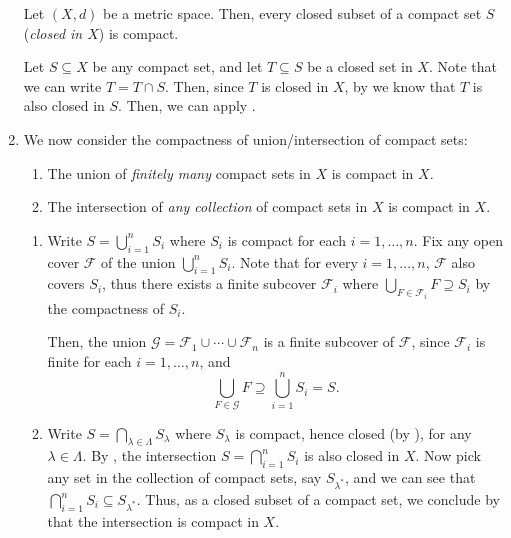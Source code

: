 \begin{enumerate}
\begin{corollary}
\label{cor:closed-subset-of-cpt-is-cpt}
Let \((X,d)\) be a metric space.  Then, every closed subset of a compact set
\(S\) (\emph{closed in \(X\)}) is compact.
\end{corollary}
\begin{pf}
Let \(S\subseteq X\) be any compact set, and let \(T\subseteq S\) be a closed
set in \(X\). Note that we can write \(T=T\cap S\). Then, since \(T\) is closed
in \(X\), by  we know that
\(T\) is also closed in \(S\).  Then, we can apply
.
\end{pf}
\item We now consider the compactness of union/intersection of compact sets:
\begin{enumerate}
\item \label{it:cpt-union-cpt} The union of \emph{finitely many} compact sets in \(X\) is compact in
\(X\).
\item \label{it:cpt-intersect-cpt} The intersection of \emph{any collection} of compact sets in \(X\) is
compact in \(X\).
\end{enumerate}
\begin{pf}
\begin{enumerate}
\item Write \(\displaystyle S=\bigcup_{i=1}^{n}S_i\) where \(S_i\) is compact
for each \(i=1,\dotsc,n\).  Fix any open cover \(\mathcal{F}\) of the union
\(\bigcup_{i=1}^{n}S_i\). Note that for every \(i=1,\dotsc,n\), \(\mathcal{F}\)
also covers \(S_i\), thus there exists a finite subcover \(\mathcal{F}_i\)
where \(\displaystyle \bigcup_{F\in\mathcal{F}_i}F\supseteq S_i\) by the compactness of \(S_i\).

Then, the union \(\mathcal{G}=\mathcal{F}_1\cup\dotsb\cup \mathcal{F}_n\) is a finite
subcover of \(\mathcal{F}\), since \(\mathcal{F}_i\) is finite for each
\(i=1,\dotsc,n\), and
\[
\bigcup_{F\in\mathcal{G}}F\supseteq \bigcup_{i=1}^{n}S_i=S.
\]
\item Write \(\displaystyle S=\bigcap_{\lambda\in\Lambda}S_{\lambda}\) where
\(S_{\lambda}\) is compact, hence closed (by
), for any \(\lambda\in\Lambda\).  By
, the intersection \(S=\displaystyle
\bigcap_{i=1}^{n}S_i\) is also closed in \(X\). Now pick any set in the
collection of compact sets, say \(S_{\lambda^*}\), and we can see that
\(\displaystyle \bigcap_{i=1}^{n}S_i\subseteq S_{\lambda^*}\).  Thus, as a
closed subset of a compact set, we conclude by
 that the intersection is compact in \(X\).
\end{enumerate}
\end{pf}
\end{enumerate}
